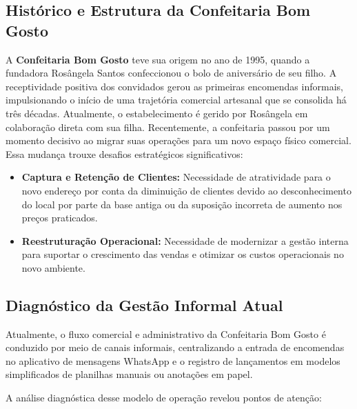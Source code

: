 \subsection{Histórico e Estrutura da Confeitaria Bom Gosto}

A \textbf{Confeitaria Bom Gosto} teve sua origem no ano de 1995, quando a fundadora Rosângela Santos confeccionou o bolo de aniversário de seu filho. A receptividade positiva dos convidados gerou as primeiras encomendas informais, impulsionando o início de uma trajetória comercial artesanal que se consolida há três décadas. Atualmente, o estabelecimento é gerido por Rosângela em colaboração direta com sua filha.
Recentemente, a confeitaria passou por um momento decisivo ao migrar suas operações para um novo espaço físico comercial. Essa mudança trouxe desafios estratégicos significativos:

\begin{itemize}
    \item \textbf{Captura e Retenção de Clientes:} Necessidade de atratividade para o novo endereço por conta da diminuição de clientes devido ao desconhecimento do local por parte da base antiga ou da suposição incorreta de aumento nos preços praticados.
    \item \textbf{Reestruturação Operacional:} Necessidade de modernizar a gestão interna para suportar o crescimento das vendas e otimizar os custos operacionais no novo ambiente.
\end{itemize}

\subsection{Diagnóstico da Gestão Informal Atual}

Atualmente, o fluxo comercial e administrativo da Confeitaria Bom Gosto é conduzido por meio de canais informais, centralizando a entrada de encomendas no aplicativo de mensagens WhatsApp e o registro de lançamentos em modelos simplificados de planilhas manuais ou anotações em papel.

A análise diagnóstica desse modelo de operação revelou pontos de atenção:

